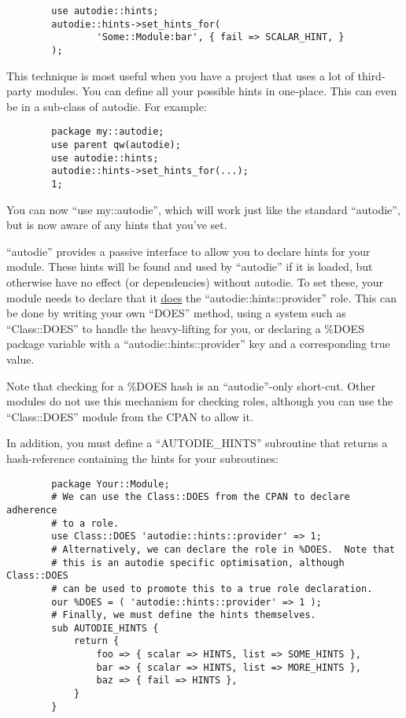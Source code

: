 \documentclass[]{article}
\renewcommand{\emph}[1]{\underline{#1}}
\begin{document}
\begin{verbatim}
        use autodie::hints;
        autodie::hints->set_hints_for(
                'Some::Module:bar', { fail => SCALAR_HINT, }
        );
\end{verbatim}

This technique is most useful when you have a project that uses a lot of
third-party modules. You can define all your possible hints in
one-place. This can even be in a sub-class of autodie. For example:

\begin{verbatim}
        package my::autodie;
        use parent qw(autodie);
        use autodie::hints;
        autodie::hints->set_hints_for(...);
        1;
\end{verbatim}

You can now ``use my::autodie'', which will work just like the standard
``autodie'', but is now aware of any hints that you've set.


``autodie'' provides a passive interface to allow you to declare hints
for your module. These hints will be found and used by ``autodie'' if it
is loaded, but otherwise have no effect (or dependencies) without
autodie. To set these, your module needs to declare that it \emph{does}
the ``autodie::hints::provider'' role. This can be done by writing your
own ``DOES'' method, using a system such as ``Class::DOES'' to handle
the heavy-lifting for you, or declaring a \%DOES package variable with a
``autodie::hints::provider'' key and a corresponding true value.

Note that checking for a \%DOES hash is an ``autodie''-only short-cut.
Other modules do not use this mechanism for checking roles, although you
can use the ``Class::DOES'' module from the CPAN to allow it.

In addition, you must define a ``AUTODIE\_HINTS'' subroutine that
returns a hash-reference containing the hints for your subroutines:

\begin{verbatim}
        package Your::Module;
        # We can use the Class::DOES from the CPAN to declare adherence
        # to a role.
        use Class::DOES 'autodie::hints::provider' => 1;
        # Alternatively, we can declare the role in %DOES.  Note that
        # this is an autodie specific optimisation, although Class::DOES
        # can be used to promote this to a true role declaration.
        our %DOES = ( 'autodie::hints::provider' => 1 );
        # Finally, we must define the hints themselves.
        sub AUTODIE_HINTS {
            return {
                foo => { scalar => HINTS, list => SOME_HINTS },
                bar => { scalar => HINTS, list => MORE_HINTS },
                baz => { fail => HINTS },
            }
        }
\end{verbatim}
\end{document}
